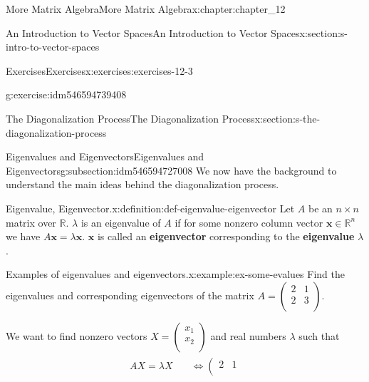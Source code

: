 \documentclass[oneside,10pt,]{book}
\newcommand{\terminology}[1]{\textbf{#1}}
\numberwithin{equation}{section}
\renewcommand{\vec}[1]{\mathbf{#1}}
\begin{document}
\begin{chapterptx}{More Matrix Algebra}{}{More Matrix Algebra}{}{}{x:chapter:chapter_12}
\begin{sectionptx}{An Introduction to Vector Spaces}{}{An Introduction to Vector Spaces}{}{}{x:section:s-intro-to-vector-spaces}
\begin{exercises-subsection}{Exercises}{}{Exercises}{}{}{x:exercises:exercises-12-3}
\begin{divisionexercise}{13}{}{}{g:exercise:idm546594739408}
\begin{enumerate}[label=(\alph*)]
\end{enumerate}
%
\end{divisionexercise}%
\end{exercises-subsection}
\end{sectionptx}
%
%
\typeout{************************************************}
\typeout{************************************************}
%
\begin{sectionptx}{The Diagonalization Process}{}{The Diagonalization Process}{}{}{x:section:s-the-diagonalization-process}
%
%
%
\typeout{************************************************}
\typeout{************************************************}
%
\begin{subsectionptx}{Eigenvalues and Eigenvectors}{}{Eigenvalues and Eigenvectors}{}{}{g:subsection:idm546594727008}
We now have the background to understand the main ideas behind the diagonalization process.%
\begin{definition}{Eigenvalue, Eigenvector.}{x:definition:def-eigenvalue-eigenvector}%
%
%
Let \(A\) be an \(n\times n\) matrix over \(\mathbb{R}\).  \(\lambda\)  is an eigenvalue of \(A\) if for some nonzero column vector  \(\vec{x}\in \mathbb{R}^n\) we have \(A \vec{x} = \lambda  \vec{x}\).  \(\vec{x}\) is called an \terminology{eigenvector} corresponding to the \terminology{eigenvalue} \(\lambda\).%
\end{definition}
\begin{example}{Examples of eigenvalues and eigenvectors.}{x:example:ex-some-evalues}%
Find the eigenvalues and corresponding eigenvectors of the matrix \(A=\left(
\begin{array}{cc}
2 & 1 \\
2 & 3 \\
\end{array}
\right)\).%
\par
We want to find nonzero vectors  \(X = \left(
\begin{array}{c}
x_1 \\
x_2 \\
\end{array}
\right)\) and real numbers \(\lambda\)  such that%
\begin{align}
\begin{split}
A X = \lambda  X \quad &\Leftrightarrow \left(
\begin{array}{cc}
2 & 1 \\

\end{array}
\end{split}
\end{align}
\end{example}
\end{subsectionptx}
\end{sectionptx}
\end{chapterptx}
\end{document}
